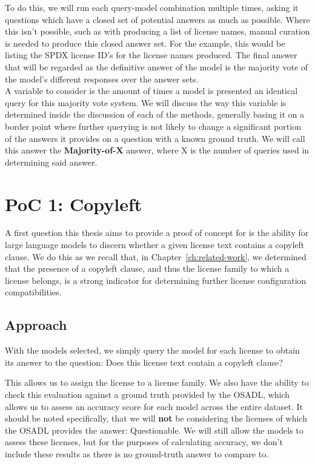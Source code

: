 To do this, we will run each query-model combination multiple times, asking it questions which have a closed set of potential answers as much as possible. Where this isn't possible, such as with producing a list of license names, manual curation is needed to produce this closed answer set. For the example, this would be listing the SPDX license ID's for the license names produced. The final answer that will be regarded as the definitive answer of the model is the majority vote of the model's different responses over the answer sets. \\

A variable to consider is the amount of times a model is presented an identical query for this majority vote system. We will discuss the way this variable is determined inside the discussion of each of the methods, generally basing it on a border point where further querying is not likely to change a significant portion of the answers it provides on a question with a known ground truth. We will call this answer the \textbf{Majority-of-X} answer, where X is the number of queries used in determining said answer.

\section{PoC 1: Copyleft}

A first question this thesis aims to provide a proof of concept for is the ability for large language models to discern whether a given license text contains a copyleft clause. We do this as we recall that, in Chapter~\ref{ch:related-work}, we determined that the presence of a copyleft clause, and thus the license family to which a license belongs, is a strong indicator for determining further license configuration compatibilities.

\subsection{Approach}

With the models selected, we simply query the model for each license to obtain its answer to the question: Does this license text contain a copyleft clause?

This allows us to assign the license to a license family. We also have the ability to check this evaluation against a ground truth provided by the OSADL, which allows us to assess an accuracy score for each model across the entire dataset. It should be noted specifically, that we will \textbf{not} be considering the licenses of which the OSADL provides the answer: Questionable. We will still allow the models to assess these licenses, but for the purposes of calculating accuracy, we don't include these results as there is no ground-truth answer to compare to.\\

